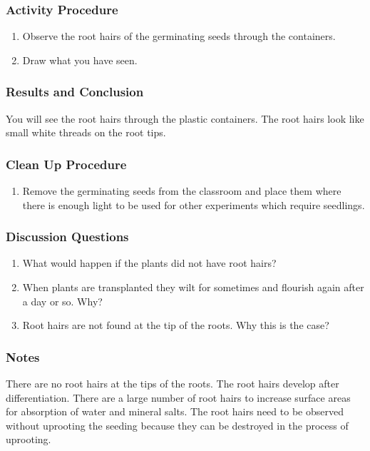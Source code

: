 \subsubsection*{Activity Procedure}
\begin{enumerate}
\item{Observe the root hairs of the germinating seeds through the containers.}
\item{Draw what you have seen.}
\end{enumerate}

\subsubsection*{Results and Conclusion}
You will see the root hairs through the plastic containers. The root hairs look like small white threads on the root tips.

\subsubsection*{Clean Up Procedure}
\begin{enumerate}
\item{Remove the germinating seeds from the classroom and place them where there is enough light to be used for other experiments which require seedlings.}
\end{enumerate}

\subsubsection*{Discussion Questions}
\begin{enumerate}
\item{What would happen if the plants did not have root hairs?}
\item{When plants are transplanted they wilt for sometimes and flourish again after a day or so. Why?}
\item{Root hairs are not found at the tip of the roots. Why this is the case?}
\end{enumerate}

\subsubsection*{Notes}
There are no root hairs at the tips of the roots. The root hairs develop after differentiation. There are a large number of root hairs to increase surface areas for absorption of water and mineral salts. The root hairs need to be observed without uprooting the seeding because they can be destroyed in the process of uprooting.


